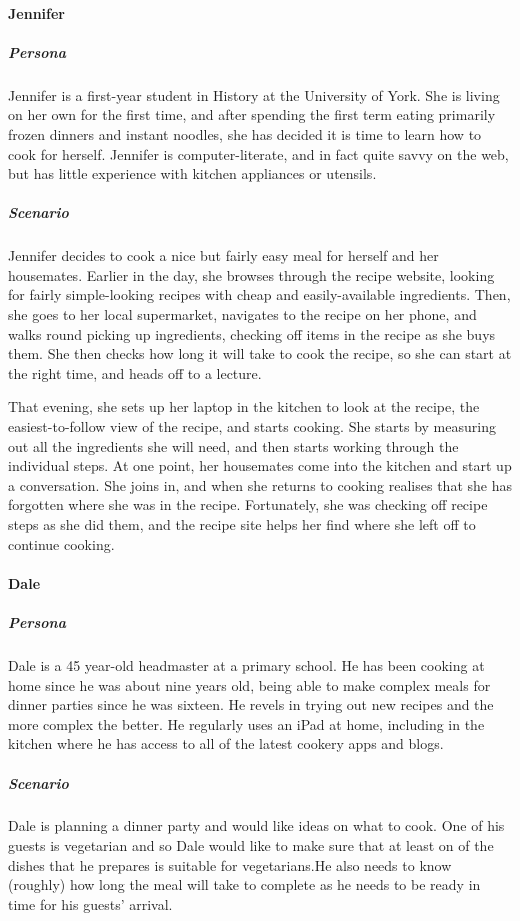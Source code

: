 \paragraph{Jennifer}
\subparagraph{Persona}
Jennifer is a first-year student in History at the University of York. She is 
living on her own for the first time, and after spending the first term eating
primarily frozen dinners and instant noodles, she has decided it is time to 
learn how to cook for herself. Jennifer is computer-literate, and in fact quite
savvy on the web, but has little experience with kitchen appliances or utensils.
\subparagraph{Scenario}
Jennifer decides to cook a nice but fairly easy meal for herself and her 
housemates. Earlier in the day, she browses through the recipe website, looking
for fairly simple-looking recipes with cheap and easily-available ingredients.
Then, she goes to her local supermarket, navigates to the recipe on her phone,
and walks round picking up ingredients, checking off items in the recipe as she
buys them. She then checks how long it will take to cook the recipe, so she can
start at the right time, and heads off to a lecture.

That evening, she sets up her laptop in the kitchen to look at the recipe,
the easiest-to-follow view of the recipe, and starts cooking. She starts by 
measuring out all the ingredients she will need, and then starts working through
the individual steps. At one point, her housemates come into the kitchen and 
start up a conversation. She joins in, and when she returns to cooking realises
that she has forgotten where she was in the recipe. Fortunately, she was
checking off recipe steps as she did them, and the recipe site helps her find
where she left off to continue cooking.

\paragraph{Dale}
\subparagraph{Persona}
Dale is a 45 year-old headmaster at a primary school. He has been cooking at home
since he was about nine years old, being able to make complex meals for dinner
parties since he was sixteen. He revels in trying out new recipes and the more
complex the better. He regularly uses an iPad at home, including in the kitchen
where he has access to all of the latest cookery apps and blogs.
\subparagraph{Scenario}
Dale is planning a dinner party and would like ideas on what to cook. One of his
guests is vegetarian and so Dale would like to make sure that at least on of the
dishes that he prepares is suitable for vegetarians.He also needs to know (roughly) 
how long the meal will take to complete as he needs to be ready in time for his 
guests' arrival.

